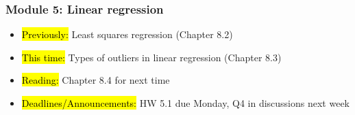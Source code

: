 
\begin{frame}
    \frametitle{Module 5: Linear regression}
    \begin{itemize}
        \item \hl{Previously: }Least squares regression (Chapter 8.2)
        \item \hl{This time: }Types of outliers in linear regression (Chapter 8.3)
        \item \hl{Reading: }Chapter 8.4 for next time
        \item \hl{Deadlines/Announcements: }HW 5.1 due Monday, Q4 in discussions next week
    \end{itemize}
    
\end{frame}